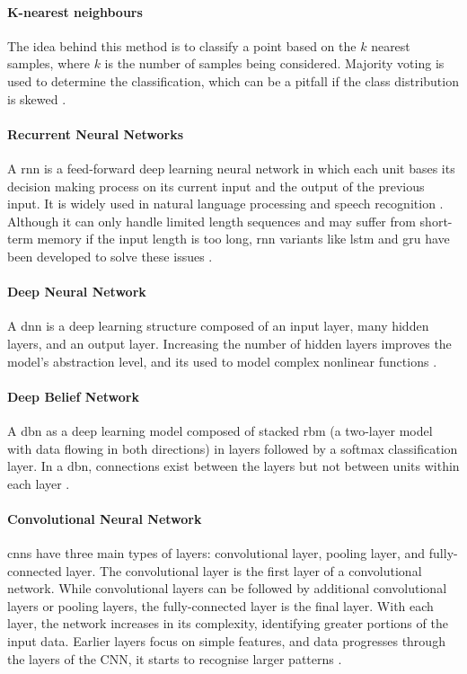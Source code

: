 \paragraph{K-nearest neighbours}
The idea behind this method is to classify a point based on the $k$ nearest samples, where $k$ is the number of samples being considered. Majority voting is used to determine the classification, which can be a pitfall if the class distribution is skewed \citep{Buczak2016}.

\paragraph{Recurrent Neural Networks}
A \gls{rnn} is a feed-forward deep learning neural network in which each unit bases its decision making process on its current input and the output of the previous input. It is widely used in natural language processing and speech recognition \citep{ibmDeepLearning}. Although it can only handle limited length sequences and may suffer from short-term memory if the input length is too long, \gls{rnn} variants like \gls{lstm} and \gls{gru} have been developed to solve these issues \citep{ahmad2021network}.

\paragraph{Deep Neural Network}
A \gls{dnn} is a deep learning structure composed of an input layer, many hidden layers, and an output layer. Increasing the number of hidden layers improves the model's abstraction level, and its used to model complex nonlinear functions \cite{ahmad2021network}.

\paragraph{Deep Belief Network}
A \gls{dbn} as a deep learning model composed of stacked \gls{rbm} (a two-layer model with data flowing in both directions) in layers followed by a softmax classification layer. In a \gls{dbn}, connections exist between the layers but not between units within each layer \cite{ahmad2021network}.

\paragraph{Convolutional Neural Network}
\glspl{cnn} have three main types of layers: convolutional layer, pooling layer, and fully-connected layer. The convolutional layer is the first layer of a convolutional network. While convolutional layers can be followed by additional convolutional layers or pooling layers, the fully-connected layer is the final layer. With each layer, the network increases in its complexity, identifying greater portions of the input data. Earlier layers focus on simple features, and data progresses through the layers of the CNN, it starts to recognise larger patterns \cite{ibmCNN}.


